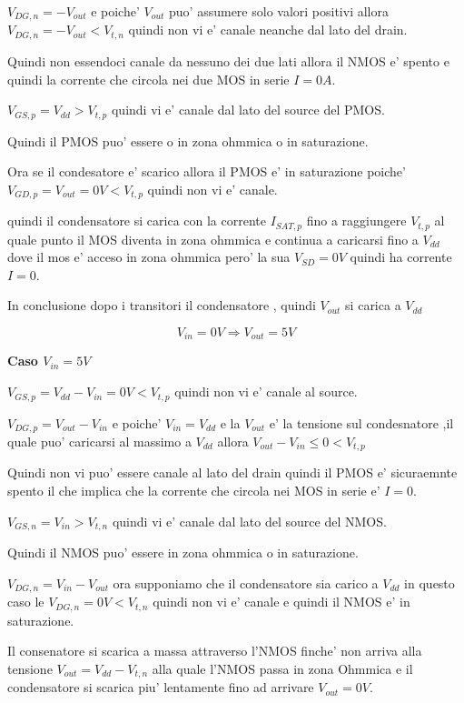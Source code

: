 \documentclass[\main/main.tex]{subfiles}
\begin{document}
$V_{DG,n} = -V_{out} $ e poiche' $V_{out}$ puo' assumere solo valori positivi allora $V_{DG,n} = -V_{out} < V_{t,n}$ quindi non vi e' canale neanche dal lato del drain.

Quindi non essendoci canale da nessuno dei due lati allora il NMOS e' spento e quindi la corrente che circola nei due MOS in serie $I = 0A$.


$V_{GS,p} = V_{dd} > V_{t,p}$ quindi vi e' canale dal lato del source del PMOS.

Quindi il PMOS puo' essere o in zona ohmmica o in saturazione.

Ora se il condesatore e' scarico allora il PMOS e' in saturazione poiche' $V_{GD,p} = V_{out} = 0V < V_{t,p}$ quindi non vi e' canale.

quindi il condensatore si carica con la corrente $I_{SAT,p}$ fino a raggiungere $V_{t,p}$ al quale punto il MOS diventa in zona ohmmica
e continua a caricarsi fino a $V_{dd}$ dove il mos e' acceso in zona ohmmica pero' la sua $V_{SD} = 0V$ quindi ha corrente $I = 0$.

In conclusione dopo i transitori il condensatore , quindi $V_{out}$ si carica a $V_{dd}$

\[V_{in} = 0V \Rightarrow V_{out} = 5V\]



\textbf{Caso $V_{in} = 5V$}

$V_{GS,p} = V_{dd} - V_{in} = 0V < V_{t,p}$ quindi non vi e' canale al source.

$V_{DG,p} = V_{out} - V_{in}$ e poiche' $V_{in} = V_{dd}$ e la $V_{out}$ e' la tensione sul condesnatore ,il quale puo' caricarsi al massimo a $V_{dd}$ allora $V_{out} - V_{in} \le 0 < V_{t,p}$

Quindi non vi puo' essere canale al lato del drain  quindi il PMOS e' sicuraemnte spento il che implica che la corrente che circola nei MOS in serie e' $I = 0$.

$V_{GS,n} = V_{in} > V_{t,n}$ quindi vi e' canale dal lato del source del NMOS.

Quindi il NMOS puo' essere in zona ohmmica o in saturazione.

$V_{DG,n} = V_{in} - V_{out}$ ora supponiamo che il condensatore sia carico a $V_{dd}$ in questo caso le $V_{DG,n} = 0V < V_{t,n}$ quindi non vi e' canale e quindi il NMOS e' in saturazione.

Il consenatore si scarica a massa attraverso l'NMOS finche' non arriva alla tensione $V_{out} = V_{dd} - V_{t,n}$ alla quale l'NMOS passa in zona Ohmmica e il condensatore si scarica piu' lentamente fino ad arrivare $V_{out} = 0V$.
\end{document}
